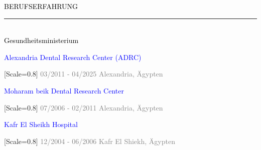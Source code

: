 {\setmainfont{Rubik Medium}\fontsize{11}{14}\selectfont\textcolor{black}{BERUFSERFAHRUNG}}\\[-4pt]
\textcolor{black}{\rule{\textwidth}{2pt}}\\[-4pt]




{\setmainfont{Rubik Medium}\fontsize{10}{14}\selectfont\textcolor{black}{Gesundheitsministerium}}

{\setmainfont{Rubik Medium}\fontsize{10}{14}\selectfont\textcolor{blue}{Alexandria Dental Research Center (ADRC)}}

{[Scale=0.8]
\textcolor{gray}{
\faCalendar\hspace{4pt}03/2011 - 04/2025\hspace{1.5em}
\faMapMarker*\hspace{4pt}Alexandria, Ägypten
}}\\[-10pt]




\vspace{0.7em}


{\setmainfont{Rubik Medium}\fontsize{10}{14}\selectfont\textcolor{blue}{Moharam beik Dental Research Center}}

{[Scale=0.8]
\textcolor{gray}{
\faCalendar\hspace{4pt}07/2006 - 02/2011\hspace{1.5em}
\faMapMarker*\hspace{4pt}Alexandria, Ägypten
}}\\[-10pt]


\vspace{0.7em}


{\setmainfont{Rubik Medium}\fontsize{10}{14}\selectfont\textcolor{blue}{Kafr El Sheikh Hospital}}

{[Scale=0.8]
\textcolor{gray}{
\faCalendar\hspace{4pt}12/2004 - 06/2006\hspace{1.5em}
\faMapMarker*\hspace{4pt}Kafr El Shiekh, Ägypten
}}\\[-10pt]


